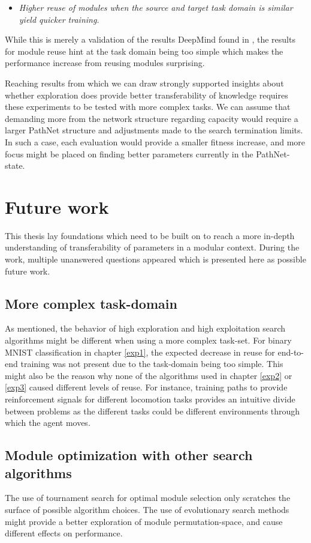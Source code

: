 \begin{itemize}
    \item \emph{Higher reuse of modules when the source and target task domain is similar yield quicker training.}
\end{itemize}
While this is merely a validation of the results DeepMind found in \cite{pathnet}, the results for module reuse hint at the task domain being too simple which makes the performance increase from reusing modules surprising. 

Reaching results from which we can draw strongly supported insights about whether exploration does provide better transferability of knowledge requires these experiments to be tested with more complex tasks. We can assume that demanding more from the network structure regarding capacity would require a larger PathNet structure and adjustments made to the search termination limits. In such a case, each evaluation would provide a smaller fitness increase, and more focus might be placed on finding better parameters currently in the PathNet-state. 

\section{Future work}
This thesis lay foundations which need to be built on to reach a more in-depth understanding of transferability of parameters in a modular context. During the work, multiple unanswered questions appeared which is presented here as possible future work. 

\subsection{More complex task-domain}
As mentioned, the behavior of high exploration and high exploitation search algorithms might be different when using a more complex task-set. For binary MNIST classification in chapter \ref{exp1}, the expected decrease in reuse for end-to-end training was not present due to the task-domain being too simple. This might also be the reason why none of the algorithms used in chapter \ref{exp2} or \ref{exp3} caused different levels of reuse. For instance, training paths to provide reinforcement signals for different locomotion tasks provides an intuitive divide between problems as the different tasks could be different environments through which the agent moves.   

\subsection{Module optimization with other search algorithms}
The use of tournament search for optimal module selection only scratches the surface of possible algorithm choices. The use of evolutionary search methods might provide a better exploration of module permutation-space, and cause different effects on performance. 

